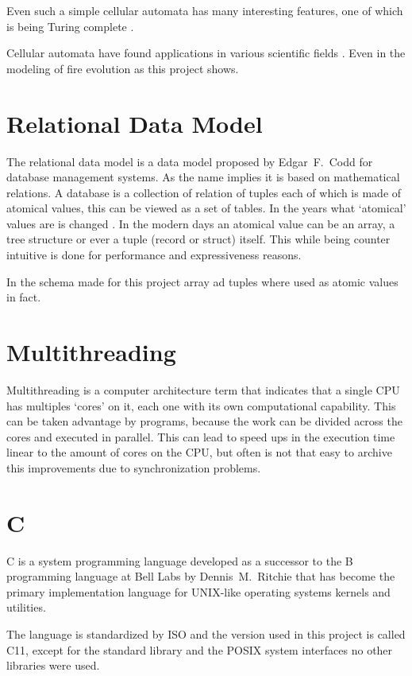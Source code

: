 \documentclass[Lau]{sapthesis} %
\let\oldsection\section
\def\subsection{\oldsection}
\def\section{\chapter}
\begin{document}
Even such a simple cellular automata has many interesting features, one of which
is being Turing complete \cite{win}.

Cellular automata have found applications in various scientific fields
\cite{cellularbio}. Even in the modeling of fire evolution as this project
shows.

\subsection{Relational Data Model}

The relational data model is a data model proposed by Edgar~F.~Codd for database
management systems. As the name implies it is based on mathematical relations. A
database is a collection of relation of tuples each of which is made of atomical
values, this can be viewed as a set of tables. In the years what `atomical'
values are is changed \cite{ordb}. In the modern days an atomical value can be
an array, a tree structure or ever a tuple (record or struct) itself. This while
being counter intuitive is done for performance and expressiveness reasons.

In the schema made for this project array ad tuples where used as atomic values
in fact.

\subsection{Multithreading}

Multithreading is a computer architecture term that indicates that a single CPU
has multiples `cores' on it, each one with its own computational capability.
This can be taken advantage by programs, because the work can be divided across
the cores and executed in parallel. This can lead to speed ups in the execution
time linear to the amount of cores on the CPU, but often is not that easy to
archive this improvements due to synchronization problems.

\subsection{C}

C is a system programming language developed as a successor to the B programming
language at Bell Labs by Dennis~M.~Ritchie that has become the primary
implementation language for UNIX-like operating systems kernels and utilities.

The language is standardized by ISO and the version used in this project is
called C11, except for the standard library and the POSIX system interfaces no
other libraries were used.
\end{document}

